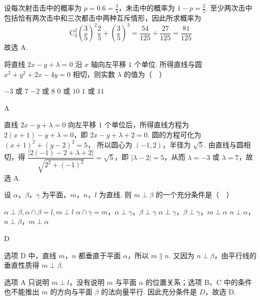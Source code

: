 \begin{solution}
设每次射击击中的概率为 \(p=0.6=\frac{3}{5}\)，未击中的概率为 \(1-p=\frac{2}{5}\). 至少两次击中包括恰有两次击中和三次都击中两种互斥情形，因此所求概率为
\[
\mathrm C_3^2\left(\frac{3}{5}\right)^2\frac{2}{5}+\left(\frac{3}{5}\right)^3
=\frac{54}{125}+\frac{27}{125}
=\frac{81}{125}
\]
故选 A.
\end{solution}

\begin{problem}
将直线 \(2x - y + \lambda = 0\) 沿 \(x\) 轴向左平移 \(1\) 个单位. 所得直线与圆 \(x^{2} + y^{2} + 2x - 4y = 0\) 相切，则实数 \(\lambda\) 的值为（\(\quad\)）

\choices
    {\(-3\) 或 \(7\)}
    {\(-2\) 或 \(8\)}
    {\(0\) 或 \(10\)}
    {\(1\) 或 \(11\)}
\end{problem}

\begin{answer}
A
\end{answer}

\begin{solution}
直线 \(2x-y+\lambda=0\) 向左平移 \(1\) 个单位后，所得直线方程为
\(2(x+1)-y+\lambda=0\)，即 \(2x-y+\lambda+2=0\). 圆的方程可化为
\((x+1)^2+(y-2)^2=5\)，
所以圆心为 \((-1,2)\)，半径为 \(\sqrt{5}\). 由直线与圆相切，得
\(\dfrac{|2(-1)-2+\lambda+2|}{\sqrt{2^2+(-1)^2}}=\sqrt{5}\)，即 \(|\lambda-2|=5\)，从而 \(\lambda=-3\) 或 \(\lambda=7\)，故选 A.
\end{solution}

\begin{problem}
设 \(\alpha\)，\(\beta\)，\(\gamma\) 为平面，\(m\)，\(n\)，\(l\) 为直线. 则 \(m \perp \beta\) 的一个充分条件是（\(\quad\)）

\choices
    {\(\alpha \perp \beta, \alpha \cap \beta = l, m \perp l\)}
    {\(\alpha \cap \gamma = m\)，\(\alpha \perp \gamma\)，\(\beta \perp \gamma\)}
    {\(\alpha \perp \gamma\)，\(\beta \perp \gamma\)，\(m \perp \alpha\)}
    {\(n \perp \alpha\)，\(n \perp \beta\)，\(m \perp \alpha\)}
\end{problem}

\begin{answer}
D
\end{answer}

\begin{solution}
选项 D 中，直线 \(m\)，\(n\) 都垂直于平面 \(\alpha\)，所以 \(m\parallel n\). 又因为 \(n\perp\beta\)，由平行线的垂直性质得 \(m\perp\beta\).

选项 A 只说明 \(m\perp l\)，没有说明 \(m\) 与平面 \(\alpha\) 的位置关系；选项 B、C 中的条件也不能推出 \(m\) 的方向与平面 \(\beta\) 的法向量平行. 因此充分条件是 \(D\)，故选 D.
\end{solution}


